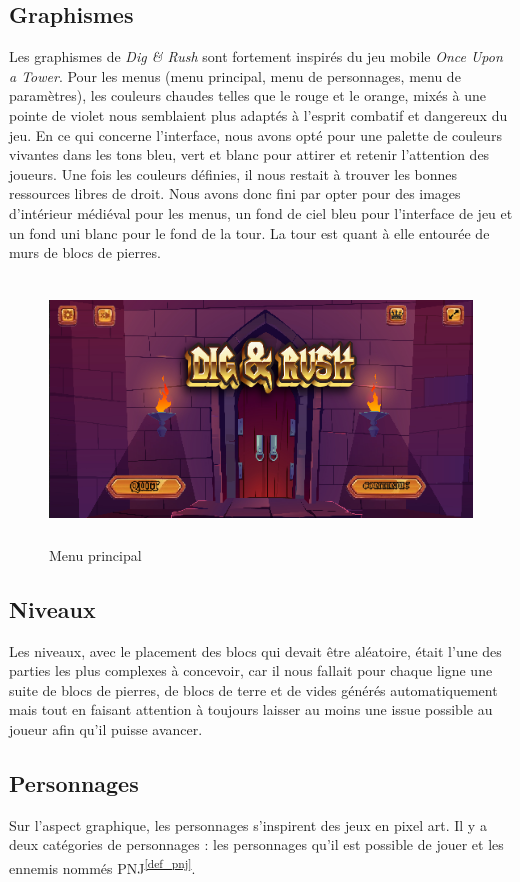\documentclass[a4paper,12pt]{article}
\newcommand\refsuscrite[1]{\textsuperscript{\ref{#1}}}
\begin{document}
\subsection{Graphismes}
Les graphismes de \textit{Dig \& Rush} sont fortement inspirés du jeu mobile \textit{Once Upon a Tower}.
Pour les menus (menu principal, menu de personnages, menu de paramètres), les couleurs  chaudes telles que le rouge et le orange, mixés à une pointe de violet nous semblaient plus adaptés à l'esprit combatif et dangereux du jeu. 
En ce qui concerne l'interface, nous avons opté pour une palette de couleurs vivantes dans les tons bleu, vert et blanc pour attirer et retenir l'attention des joueurs.
Une fois les couleurs définies, il nous restait à trouver les bonnes ressources libres de droit. Nous avons donc fini par opter pour des images d'intérieur médiéval pour les menus, un fond de ciel bleu pour l'interface de jeu et un fond uni blanc pour le fond de la tour.
La tour est quant à elle entourée de murs de blocs de pierres.
\begin{figure}[h]
	\centering
	\includegraphics[height=7cm]{img/menu.png}
	\caption{Menu principal}
	\label{menu}
\end{figure}

\subsection{Niveaux}
Les niveaux, avec le placement des blocs qui devait être aléatoire, était l'une des parties les plus complexes à concevoir, car il nous fallait pour chaque ligne une suite de blocs de pierres, de blocs de terre et de vides générés automatiquement mais tout en faisant attention à toujours laisser au moins une issue possible au joueur afin qu'il puisse avancer.

\subsection{Personnages}
Sur l’aspect graphique, les personnages s’inspirent des jeux en pixel art. 
Il y a deux catégories de personnages : les personnages qu’il est possible de jouer et les ennemis nommés PNJ\refsuscrite{def_pnj}.
\end{document}
